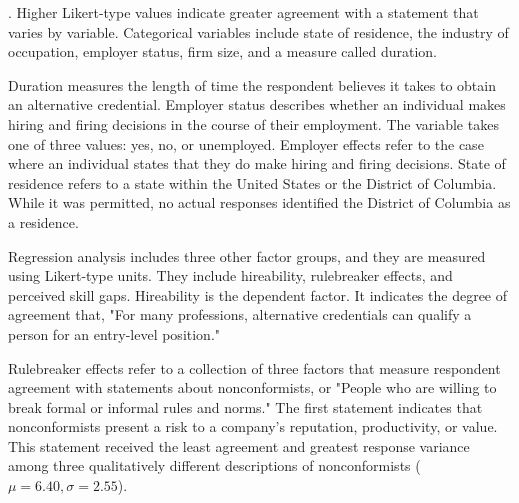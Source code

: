 \documentclass[review]{elsarticle}
\begin{document}
{    %
}.
Higher Likert-type values indicate greater agreement with a statement that varies by variable.
Categorical variables include state of residence,
the industry of occupation,
employer status,
firm size,
and a measure called duration.

Duration measures the length of time the respondent believes it takes to obtain an alternative credential.
Employer status describes whether an individual makes hiring and firing decisions in the course of their employment.
The variable takes one of three values: yes, no, or unemployed.
Employer effects refer to the case where an individual states that they do make hiring and firing decisions.
State of residence refers to a state within the United States or the District of Columbia.
While it was permitted, no actual responses identified the District of Columbia as a residence.

Regression analysis includes three other factor groups, and they are measured using Likert-type units.
They include hireability, rulebreaker effects, and perceived skill gaps.
Hireability is the dependent factor.
It indicates the degree of agreement that, "For many professions, alternative credentials can qualify a person for an entry-level position."

Rulebreaker effects refer to a collection of three factors that measure respondent agreement with statements about nonconformists, or "People who are willing to break formal or informal rules and norms."
The first statement indicates that nonconformists present a risk to a company's reputation, productivity, or value.
This statement received the least agreement and greatest response variance among three qualitatively different descriptions of nonconformists ($\mu = 6.40, \sigma = 2.55$).
\end{document}
